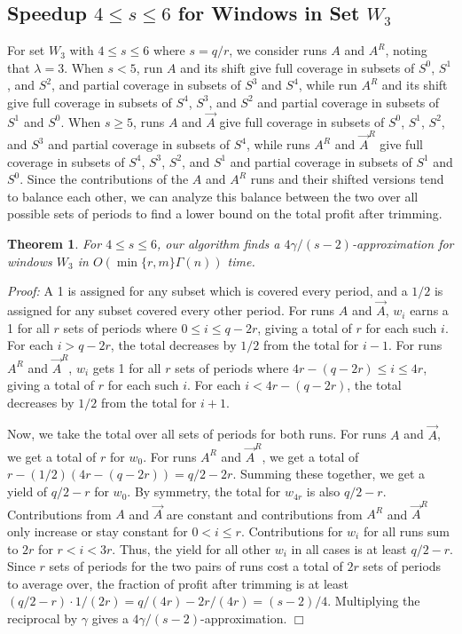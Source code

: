 \documentclass[11pt]{article}
\newtheorem{theorem}{Theorem}[section]
\newcommand\QED{\ifhmode\allowbreak\else\nobreak\fi
\quad\nobreak$\Box$\medbreak}
\newcommand{\proofstart}{\par\noindent \emph{Proof:} }
\newcommand{\proofend}{\QED\par}
\newenvironment{proof}{\proofstart}{\proofend}
\begin{document}
\subsection{Speedup $4 \leq s \leq 6$ for Windows in Set $W_3$}

For set $W_3$ with $4 \leq s \leq 6$ where $s = q/r$, we consider runs $A$ and $A^R$, noting that $\lambda = 3$.
When $s < 5$, run $A$ and its shift give full coverage in subsets of $S^0$, $S^1$, and $S^2$, and partial coverage in subsets of $S^3$ and $S^4$, while run $A^R$ and its shift give full coverage in subsets of $S^4$, $S^3$, and $S^2$ and partial coverage in subsets of $S^1$ and $S^0$.  When $s \geq 5$, runs $A$ and $\vec{A}$ give full coverage in subsets of $S^0$, $S^1$, $S^2$, and $S^3$ and partial coverage in subsets of $S^4$, while runs $A^R$ and $\vec{A}^R$ give full coverage in subsets of $S^4$, $S^3$, $S^2$, and $S^1$ and partial coverage in subsets of $S^1$ and $S^0$.  Since the contributions of the $A$ and $A^R$ runs and their shifted versions tend to balance each other, we can analyze this balance between the two over all possible sets of periods to find a lower bound on the total profit after trimming.


\begin{theorem}
For $4 \leq s \leq 6$, our algorithm finds a $4\gamma/(s - 2)$-approximation for windows $W_3$ in $O(\min\{r, m\}\Gamma(n))$ time.
\end{theorem}

\begin{proof}
A 1 is assigned for any subset which is covered every period, and a $1/2$ is assigned for any subset covered every other period.  For runs $A$ and $\vec{A}$, $w_i$ earns a 1 for all $r$ sets of periods where $0 \leq i \leq q - 2r$, giving a total of $r$ for each such $i$.  For each $i > q - 2r$, the total decreases by $1/2$ from the total for $i - 1$.   For runs $A^R$ and $\vec{A}^R$, $w_i$ gets 1 for all $r$ sets of periods where $4r - (q - 2r) \leq i \leq 4r$, giving a total of $r$ for each such $i$.  For each $i < 4r - (q - 2r)$, the total decreases by $1/2$ from the total for $i + 1$.

Now, we take the total over all sets of periods for both runs.  For runs $A$ and $\vec{A}$, we get a total of $r$ for $w_0$.  For runs $A^R$ and $\vec{A}^R$, we get a total of $r - (1/2)(4r - (q - 2r)) = q/2 - 2r$.  Summing these together, we get a yield of $q/2 - r$ for $w_0$.  By symmetry, the total for $w_{4r}$ is also $q/2 - r$.  Contributions from $A$ and $\vec{A}$ are constant and contributions from $A^R$ and $\vec{A}^R$ only increase or stay constant for $0 < i \leq r$.  Contributions for $w_i$ for all runs sum to $2r$ for $r < i < 3r$.   Thus, the yield for all other $w_i$ in all cases is at least $q/2 - r$.  Since $r$ sets of periods for the two pairs of runs cost a total of $2r$ sets of periods to average over, the fraction of profit after trimming is at least $(q/2 - r)\cdot 1/(2r) = q/(4r) - 2r/(4r) = (s - 2)/4$.  Multiplying the reciprocal by $\gamma$ gives a $4\gamma/(s - 2)$-approximation.
\end{proof}
\end{document}
